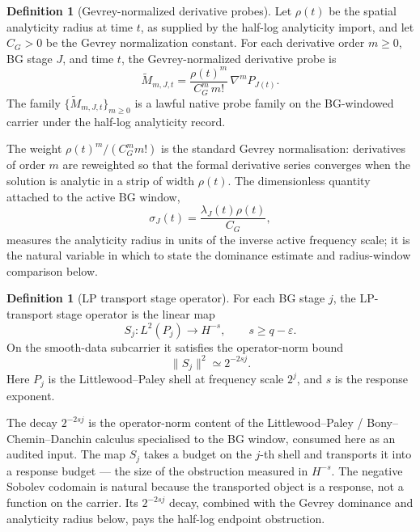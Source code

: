 \documentclass[11pt]{article}
\newcommand{\eps}{\varepsilon}
\newcommand{\CG}{C_G}
\newcommand{\sigmaJ}{\sigma_J}
\newcommand{\lambdaJ}{\lambda_J}
\newcommand{\LPtr}{S_j}
\theoremstyle{definition}
\newtheorem{definition}[theorem]{Definition}
\begin{document}
\begin{definition}[Gevrey-normalized derivative probes]
\label{def:ns:gevrey-probes}
Let \(\rho(t)\) be the spatial analyticity radius at time \(t\), as
supplied by the half-log analyticity import, and let \(\CG>0\) be the
Gevrey normalization constant.  For each derivative order \(m\ge 0\),
BG stage \(J\), and time \(t\), the Gevrey-normalized derivative probe
is
\[
  \widetilde M_{m,J,t}
  =
  \frac{\rho(t)^m}{\CG^m\,m!}\,\nabla^m P_{J(t)} .
\]
The family \(\{\widetilde M_{m,J,t}\}_{m\ge 0}\) is a lawful native
probe family on the BG-windowed carrier under the half-log analyticity
record.
\end{definition}

The weight \(\rho(t)^m/(\CG^m m!)\) is the standard Gevrey
normalisation: derivatives of order \(m\) are reweighted so that the
formal derivative series converges when the solution is analytic in a
strip of width \(\rho(t)\).  The dimensionless quantity attached to
the active BG window,
\[
  \sigmaJ(t)=\frac{\lambdaJ(t)\rho(t)}{\CG},
\]
measures the analyticity radius in units of the inverse active
frequency scale; it is the natural variable in which to state the
dominance estimate and radius-window comparison below.

\begin{definition}[LP transport stage operator]
\label{def:ns:lp-transport}
For each BG stage \(j\), the LP-transport stage operator is the linear
map
\[
  \LPtr\colon L^2(P_j)\longrightarrow H^{-s},
  \qquad s\ge q-\eps .
\]
On the smooth-data subcarrier it satisfies the operator-norm bound
\[
  \|\LPtr\|^2\simeq 2^{-2sj}.
\]
Here \(P_j\) is the Littlewood--Paley shell at frequency scale \(2^j\),
and \(s\) is the response exponent.
\end{definition}

The decay \(2^{-2sj}\) is the operator-norm content of the
Littlewood--Paley / Bony--Chemin--Danchin calculus specialised to the
BG window, consumed here as an audited input.  The map \(\LPtr\) takes
a budget on the \(j\)-th shell and transports it into a response
budget --- the size of the obstruction measured in \(H^{-s}\).  The
negative Sobolev codomain is natural because the transported object is
a response, not a function on the carrier.  Its
\(2^{-2sj}\) decay, combined with the Gevrey dominance and analyticity
radius below, pays the half-log endpoint obstruction.
\end{document}

